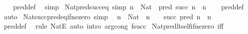 \begin{isabellebody}
%
\isadelimproof
\ \ %
\endisadelimproof
%
\isatagproof
{}\isamarkupfalse%
\ pred{\isacharunderscore}{\kern0pt}def\ \isamarkupfalse%
\ simp%
\endisatagproof
{\isafoldproof}%
%
\isadelimproof
\isanewline
%
\endisadelimproof
\isanewline
{}\isamarkupfalse%
\ Nat{\isacharunderscore}{\kern0pt}pred{\isacharunderscore}{\kern0pt}succ{\isacharunderscore}{\kern0pt}eq\ {\isacharbrackleft}{\kern0pt}simp{\isacharbrackright}{\kern0pt}{\isacharcolon}{\kern0pt}\ {\isachardoublequoteopen}n\ {\isacharcolon}{\kern0pt}\ Nat\ {\isasymLongrightarrow}\ pred\ {\isacharparenleft}{\kern0pt}succ\ n{\isacharparenright}{\kern0pt}\ {\isacharequal}{\kern0pt}\ n{\isachardoublequoteclose}\isanewline
%
\isadelimproof
\ \ %
\endisadelimproof
%
\isatagproof
{}\isamarkupfalse%
\ pred{\isacharunderscore}{\kern0pt}def\ \isamarkupfalse%
\ auto%
\endisatagproof
{\isafoldproof}%
%
\isadelimproof
\isanewline
%
\endisadelimproof
\isanewline
{}\isamarkupfalse%
\ Nat{\isacharunderscore}{\kern0pt}succ{\isacharunderscore}{\kern0pt}pred{\isacharunderscore}{\kern0pt}eq{\isacharunderscore}{\kern0pt}if{\isacharunderscore}{\kern0pt}ne{\isacharunderscore}{\kern0pt}zero\ {\isacharbrackleft}{\kern0pt}simp{\isacharbrackright}{\kern0pt}{\isacharcolon}{\kern0pt}\isanewline
\ \ {\isachardoublequoteopen}n\ {\isacharcolon}{\kern0pt}\ Nat\ {\isasymLongrightarrow}\ n\ {\isasymnoteq}\ {}\ {\isasymLongrightarrow}\ succ\ {\isacharparenleft}{\kern0pt}pred\ n{\isacharparenright}{\kern0pt}\ {\isacharequal}{\kern0pt}\ n{\isachardoublequoteclose}\isanewline
%
\isadelimproof
\ \ %
\endisadelimproof
%
\isatagproof
{}\isamarkupfalse%
\ pred{\isacharunderscore}{\kern0pt}def\ \isamarkupfalse%
\ {\isacharparenleft}{\kern0pt}rule\ NatE{\isacharparenright}{\kern0pt}\ {\isacharparenleft}{\kern0pt}auto\ intro{\isacharbang}{\kern0pt}{\isacharcolon}{\kern0pt}\ arg{\isacharunderscore}{\kern0pt}cong{\isacharbrackleft}{\kern0pt}\ {\isacharquery}{\kern0pt}f{\isacharequal}{\kern0pt}{\isachardoublequoteopen}succ{\isachardoublequoteclose}{\isacharbrackright}{\kern0pt}{\isacharparenright}{\kern0pt}%
\endisatagproof
{\isafoldproof}%
%
\isadelimproof
%
\endisadelimproof
%
\isadelimdocument
%
\endisadelimdocument
%
\isatagdocument
%
\isamarkuptrue%
%
\endisatagdocument
{\isafolddocument}%
%
\isadelimdocument
%
\endisadelimdocument
{}\isamarkupfalse%
\ Nat{\isacharunderscore}{\kern0pt}pred{\isacharunderscore}{\kern0pt}lt{\isacharunderscore}{\kern0pt}self{\isacharunderscore}{\kern0pt}if{\isacharunderscore}{\kern0pt}ne{\isacharunderscore}{\kern0pt}zero\ {\isacharbrackleft}{\kern0pt}iff{\isacharbrackright}{\kern0pt}{\isacharcolon}{\kern0pt}\isanewline

\end{isabellebody}
